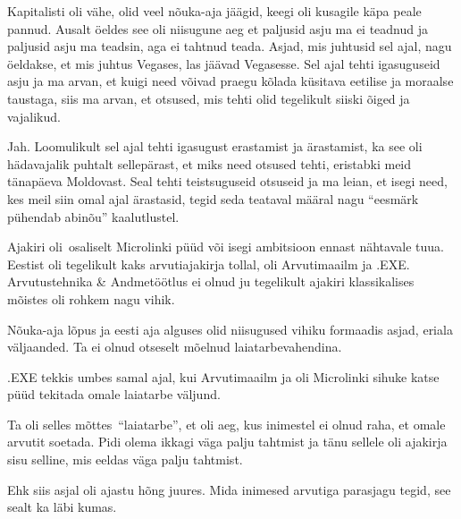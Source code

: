 Kapitalisti oli vähe, olid veel nõuka-aja jäägid, keegi oli kusagile käpa peale 
pannud. Ausalt öeldes see oli niisugune aeg et paljusid asju ma ei teadnud ja 
paljusid asju ma teadsin, aga ei tahtnud teada. Asjad, mis juhtusid sel ajal, 
nagu öeldakse, et mis juhtus Vegases, las jäävad Vegasesse. Sel ajal tehti 
igasuguseid asju ja ma arvan, et kuigi need võivad praegu kõlada küsitava 
eetilise ja moraalse taustaga, siis ma arvan, et otsused, mis tehti olid 
tegelikult siiski õiged ja vajalikud.


Jah. Loomulikult sel ajal tehti igasugust erastamist ja ärastamist, ka see oli 
hädavajalik puhtalt sellepärast, et miks need otsused tehti, eristabki meid 
tänapäeva  Moldovast. Seal tehti teistsuguseid otsuseid ja ma leian, et isegi 
need, kes meil siin omal ajal ärastasid, tegid seda teataval määral nagu 
\enquote{eesmärk pühendab abinõu} kaalutlustel.


Ajakiri oli osaliselt Microlinki püüd või isegi ambitsioon ennast nähtavale 
tuua.  Eestist oli tegelikult kaks arvutiajakirja tollal, oli 
Arvutimaailm ja .EXE. Arvutustehnika \& 
Andmetöötlus ei olnud ju tegelikult ajakiri klassikalises mõistes oli rohkem 
nagu vihik.

Nõuka-aja lõpus ja eesti  aja alguses olid niisugused vihiku formaadis asjad, 
eriala väljaanded. Ta ei olnud otseselt mõelnud laiatarbevahendina.

.EXE tekkis umbes samal ajal, kui Arvutimaailm ja oli Microlinki sihuke katse 
püüd tekitada omale laiatarbe väljund.


Ta oli selles mõttes \enquote{laiatarbe}, et oli aeg, kus inimestel ei olnud 
raha, et omale arvutit soetada. Pidi olema ikkagi väga palju tahtmist ja tänu 
sellele oli ajakirja sisu selline, mis eeldas väga palju tahtmist. 

Ehk siis asjal oli ajastu hõng juures. Mida inimesed arvutiga parasjagu tegid, 
see  sealt ka läbi kumas. 


